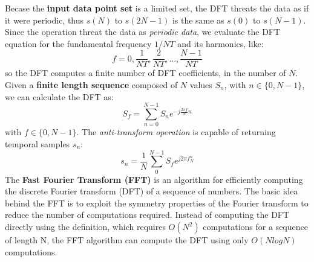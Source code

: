 \documentclass[10pt,a4paper]{report}
\theoremstyle{definition}
\begin{document}
Becase the \textbf{input data point set} is a limited set, the DFT threats the data as if it were periodic, thus $s(N)$ to $s(2N-1)$ is the same as $s(0)$ to $s(N-1)$. \\
Since the operation threat the data as \textit{periodic data}, we evaluate the DFT equation for the fundamental frequency $1/NT$ and its harmonics, like:
\begin{equation}
	f = 0, \frac{1}{NT}, \frac{2}{NT}, ..., \frac{N-1}{NT}
\end{equation}
so the DFT computes a finite number of DFT coefficients, in the number of $N$. \\
Given a \textbf{finite length sequence} composed of $N$ values $S_{n}$, with $n \in \{0, N-1\}$, we can calculate the DFT as:
\begin{equation}
	S_{f} = \sum_{n=0}^{N-1} S_{n}e^{-j\frac{2\pi f}{N}n} 
\end{equation} 
with $f \in \{0,N-1\}$. The \textit{anti-transform operation} is capable of returning temporal samples $s_{n}$:
\begin{equation}
	s_{n} = \frac{1}{N} \sum_{0}^{N-1} S_{f} e^{j2\pi f^{n}_{N}}
\end{equation}
The \textbf{Fast Fourier Transform (FFT)} is an algorithm for efficiently computing the discrete Fourier transform (DFT) of a sequence of numbers. 
The basic idea behind the FFT is to exploit the symmetry properties of the Fourier transform to reduce the number of computations required. Instead of computing the DFT directly using the definition, which requires $O(N^{2})$ computations for a sequence of length N, the FFT algorithm can compute the DFT using only $O(N log N)$ computations.
\end{document}
